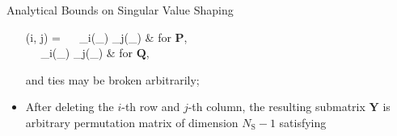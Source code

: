 \begin{section}{Analytical Bounds on Singular Value Shaping}
\begin{corollary}
\begin{itemize}
				\begin{subnumcases}{(i, j) =}
					\  \ \sigma_i(_) \sigma_j(_) & for $\mathbf{P}$, \label{eq:sv_nth_max_pair} \\
					\  \ \sigma_i(_) \sigma_j(_) & for $\mathbf{Q}$, \label{eq:sv_nth_min_pair}
				\end{subnumcases}
				and ties may be broken arbitrarily;
			\item After deleting the $i$-th row and $j$-th column, the resulting submatrix $\mathbf{Y}$ is arbitrary permutation matrix of dimension $N_\mathrm{S}-1$ satisfying


\end{itemize}
\end{corollary}
\end{section}
